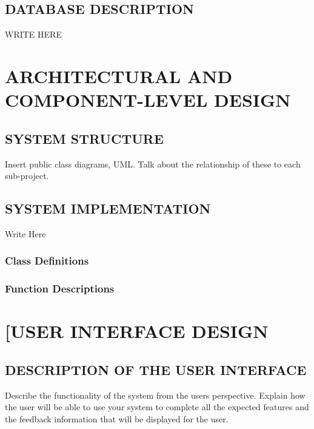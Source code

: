 \documentclass[twoside,letterpaper]{article}
\begin{document}
\subsection[DATABASE DESCRIPTION]{\rmfamily\bfseries\color{black}
DATABASE DESCRIPTION}
{\rmfamily\color{black}
WRITE HERE}


\clearpage\section[ARCHITECTURAL AND COMPONENT-LEVEL DESIGN]{\rmfamily\bfseries\color{black}
ARCHITECTURAL AND COMPONENT-LEVEL DESIGN}
\subsection[SYSTEM STRUCTURE]{\rmfamily\bfseries\color{black}
SYSTEM STRUCTURE}
Insert public class diagrams, UML. Talk about the relationship of these to each sub-project.

\subsection[SYSTEM IMPLEMENTATION]{\rmfamily\bfseries\color{black}
SYSTEM IMPLEMENTATION}
{\rmfamily\color{black}
Write Here
}
\subsubsection{Class Definitions}

\subsubsection{Function Descriptions}


\clearpage\section[USER INTERFACE DESIGN]{\rmfamily\bfseries\color{black}
[USER INTERFACE DESIGN}

\subsection[DESCRIPTION OF THE USER INTERFACE]{\rmfamily\bfseries\color{black}
DESCRIPTION OF THE USER INTERFACE}
{\rmfamily\color{black}
Describe the functionality of the system from the users perspective. Explain how the user
will be able to use your system to complete all the expected features and the feedback
information that will be displayed for the user.
}
\end{document}
